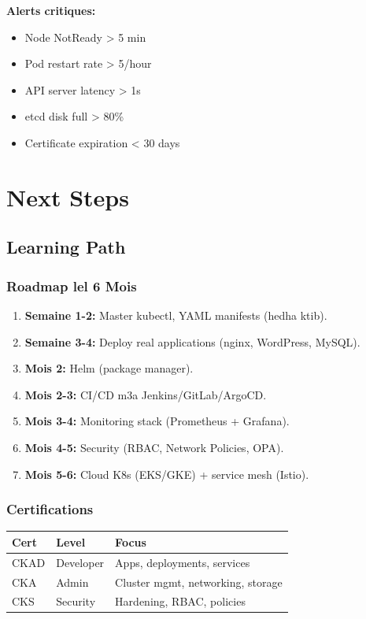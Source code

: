 \documentclass[11pt,a4paper]{book}
\begin{document}
\textbf{Alerts critiques:}
\begin{itemize}
  \item Node NotReady > 5 min
  \item Pod restart rate > 5/hour
  \item API server latency > 1s
  \item etcd disk full > 80\%
  \item Certificate expiration < 30 days
\end{itemize}

\cleardoublepage

\part{Next Steps}

\chapter{Learning Path}

\section{Roadmap lel 6 Mois}

\begin{enumerate}
  \item \textbf{Semaine 1-2:} Master kubectl, YAML manifests (hedha ktib).
  \item \textbf{Semaine 3-4:} Deploy real applications (nginx, WordPress, MySQL).
  \item \textbf{Mois 2:} Helm (package manager).
  \item \textbf{Mois 2-3:} CI/CD m3a Jenkins/GitLab/ArgoCD.
  \item \textbf{Mois 3-4:} Monitoring stack (Prometheus + Grafana).
  \item \textbf{Mois 4-5:} Security (RBAC, Network Policies, OPA).
  \item \textbf{Mois 5-6:} Cloud K8s (EKS/GKE) + service mesh (Istio).
\end{enumerate}

\section{Certifications}

\begin{longtable}{L{3cm}L{4cm}L{5cm}}
\toprule
\textbf{Cert} & \textbf{Level} & \textbf{Focus} \\
\midrule
CKAD & Developer & Apps, deployments, services \\
CKA & Admin & Cluster mgmt, networking, storage \\
CKS & Security & Hardening, RBAC, policies \\
\bottomrule
\end{longtable}
\end{document}
